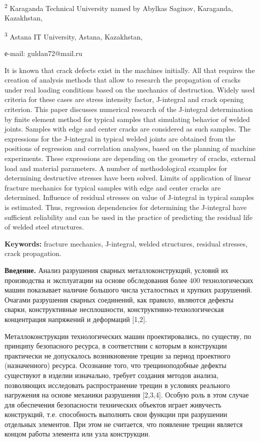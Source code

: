 \textsuperscript{2} Karaganda Technical University named by Abylkas
Saginov, Karaganda, Kazakhstan,

\textsuperscript{3} Astana IT University, Astana, Kazakhstan,

е-mail: guldan72@mail.ru

It is known that crack defects exist in the machines initially. All that
requires the creation of analysis methods that allow to research the
propagation of cracks under real loading conditions based on the
mechanics of destruction. Widely used criteria for these cases are
stress intensity factor, J-integral and crack opening criterion. This
paper discusses numerical research of the J-integral determination by
finite element method for typical samples that simulating behavior of
welded joints. Samples with edge and center cracks are considered as
such samples. The expressions for the J-integral in typical welded
joints are obtained from the positions of regression and correlation
analyses, based on the planning of machine experiments. These
expressions are depending on the geometry of cracks, external load and
material parameters. A number of methodological examples for determining
destructive stresses have been solved. Limits of application of linear
fracture mechanics for typical samples with edge and center cracks are
determined. Influence of residual stresses on value of J-integral in
typical samples is estimated. Thus, regression dependencies for
determining the J-integral have sufficient reliability and can be used
in the practice of predicting the residual life of welded steel
structures.

{\bfseries Keywords:} fracture mechanics, J-integral, welded structures,
residual stresses, crack propagation.

{\bfseries Введение.} Анализ разрушения сварных металлоконструкций, условий
их производства и эксплуатации на основе обследования более 400
технологических машин показывает наличие большого числа усталостных и
хрупких разрушений. Очагами разрушения сварных соединений, как правило,
являются дефекты сварки, конструктивные несплошности,
конструктивно-технологическая концентрация напряжений и деформаций
{[}1,2{]}.

Металлоконструкции технологических машин проектировались, по существу,
по принципу безопасного ресурса, в соответствии с которым в конструкции
практически не допускалось возникновение трещин за период проектного
(назначенного) ресурса. Осознание того, что трещиноподобные дефекты
существуют в изделии изначально, требует создания методов анализа,
позволяющих исследовать распространение трещин в условиях реального
нагружения на основе механики разрушения {[}2,3,4{]}. Особую роль в этом
случае для обеспечения безопасности технических объектов играет
живучесть конструкций, т.е. способность выполнять свои функции при
разрушении отдельных элементов. При этом не считается, что появление
трещин является концом работы элемента или узла конструкции.


